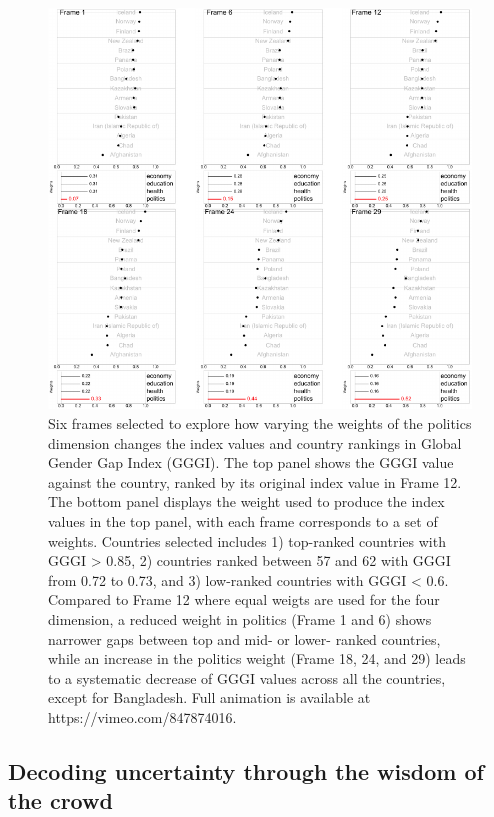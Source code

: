 \documentclass[
]{interact}
\begin{document}
\begin{figure}

{\centering \includegraphics{tidyindex_files/figure-pdf/fig-idx-tour-1.pdf}

}

\caption{\label{fig-idx-tour}Six frames selected to explore how varying
the weights of the politics dimension changes the index values and
country rankings in Global Gender Gap Index (GGGI). The top panel shows
the GGGI value against the country, ranked by its original index value
in Frame 12. The bottom panel displays the weight used to produce the
index values in the top panel, with each frame corresponds to a set of
weights. Countries selected includes 1) top-ranked countries with GGGI
\textgreater{} 0.85, 2) countries ranked between 57 and 62 with GGGI
from 0.72 to 0.73, and 3) low-ranked countries with GGGI \textless{}
0.6. Compared to Frame 12 where equal weigts are used for the four
dimension, a reduced weight in politics (Frame 1 and 6) shows narrower
gaps between top and mid- or lower- ranked countries, while an increase
in the politics weight (Frame 18, 24, and 29) leads to a systematic
decrease of GGGI values across all the countries, except for Bangladesh.
Full animation is available at https://vimeo.com/847874016.}

\end{figure}

\hypertarget{decoding-uncertainty-through-the-wisdom-of-the-crowd}{%
\subsection{Decoding uncertainty through the wisdom of the
crowd}\label{decoding-uncertainty-through-the-wisdom-of-the-crowd}}
\end{document}
